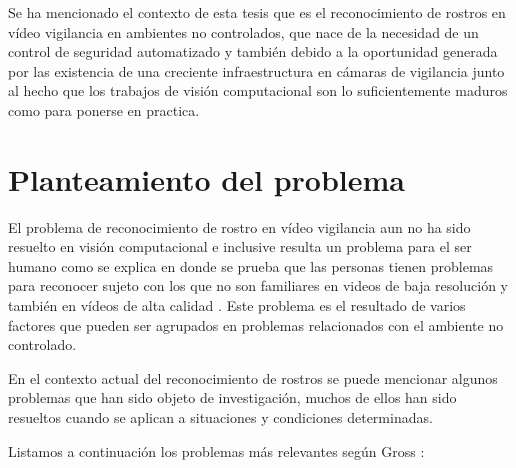 Se ha mencionado el contexto de esta tesis que es el reconocimiento de rostros en vídeo vigilancia en ambientes no controlados, que nace de la necesidad de un control de seguridad automatizado y también debido a la oportunidad generada por las existencia de una creciente infraestructura en cámaras de vigilancia junto al hecho que los trabajos de visión computacional son lo suficientemente maduros como para ponerse en practica.


\section{Planteamiento del problema}\label{ssc:PlanteamientoProblema}
El problema de reconocimiento de rostro en vídeo vigilancia aun no ha sido resuelto en visión computacional e inclusive resulta un problema para el ser humano como se explica en \cite{burton1999face} donde se prueba que las personas tienen problemas para reconocer sujeto con los que no son familiares en videos de baja resolución y también en vídeos de alta calidad \cite{burton1999face}.
Este problema es el resultado de varios factores que pueden ser agrupados en problemas relacionados con el ambiente no controlado.

En el contexto actual del reconocimiento de rostros se puede mencionar algunos problemas que han sido objeto de investigación, muchos de ellos han sido resueltos cuando se aplican a situaciones y condiciones determinadas. 

Listamos a continuación  los problemas más relevantes según Gross  \cite{gross2001quo}:

